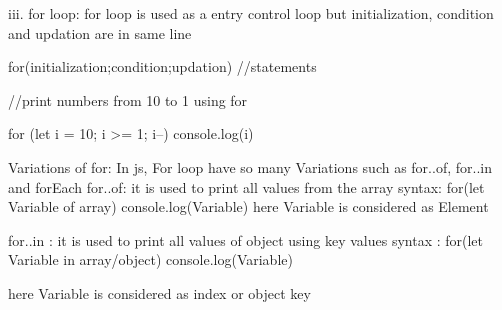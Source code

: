iii. for loop:  for loop is used as a entry control loop but initialization, condition and updation are in same line

for(initialization;condition;updation){
  //statements
}

//print numbers from 10 to 1 using for

for (let i = 10; i >= 1; i--)
{
    console.log(i)
}

Variations of for:
  In js, For loop have so many Variations such as for..of, for..in and forEach
for..of: it is used to print all values from the array
syntax: for(let Variable of array){
  console.log(Variable)
}
here Variable is considered as Element 

for..in : it is used to print all values of object using key values
syntax : for(let Variable in array/object){
  console.log(Variable)
}

here Variable is considered as index or object key